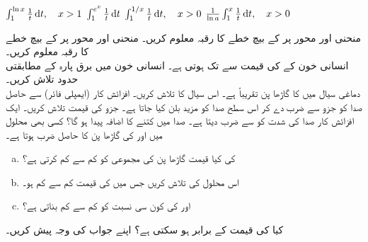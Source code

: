 $\int_1^{\ln x}\frac{1}{t}\dif t,\quad x>1$
$\int_1^{e^x}\frac{1}{t}\dif t$
$\int_1^{1/x}\frac{1}{t}\dif t,\quad x>0$
$\frac{1}{\ln a}\int_1^x\frac{1}{t}\dif t,\quad x>0$

منحنی  اور محور  پر   کے بیچ خطے کا رقبہ معلوم کریں۔
منحنی  اور محور  پر   کے بیچ خطے کا رقبہ معلوم کریں۔
\\
انسانی خون کے  کی قیمت  سے  تک ہوتی ہے۔ انسانی خون میں برق پارہ  کے مطابقتی حدود تلاش کریں۔ 
\\
دماغی سیال میں  کا گاڑھا پن تقریباً  ہے۔ اس سیال کا  تلاش کریں۔
افزائش کار (ایمپلی فائر) سے حاصل صدا کو جزو  سے ضرب دے کر اس سطح صدا کو  مزید بلن کیا جاتا ہے۔ جزو  کی قیمت تلاش کریں۔
ایک افزائش کار صدا کی شدت کو  سے ضرب دیتا ہے۔ صدا میں کتنے  کا اضافہ پیدا ہو گا؟ 
کسی بھی محلول میں   اور  کی گاڑھا پن کا حاصل ضرب  ہوتا ہے۔
\begin{enumerate}[a.]
\item
{} کی کیا قیمت گاڑھا پن کی مجموعی  کو کم سے کم  کرتی ہے؟
\item
اس محلول کی  تلاش کریں  جس میں  کی قیمت کم سے کم ہو۔
\item
{} اور  کی کون سی نسبت  کو کم سے کم بناتی ہے؟
\end{enumerate}
کیا  کی قیمت  کے برابر ہو سکتی ہے؟ اپنے جواب کی وجہ   پیش کریں۔

